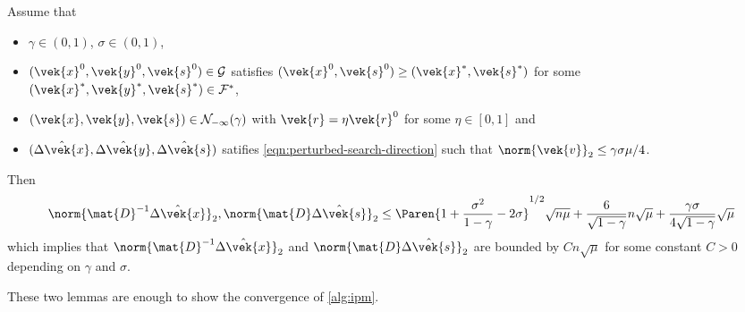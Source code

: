 \begin{lemma}\label{thm:delta-x-s-bound}
  Assume that
  \begin{itemize}
    \item \(\gamma \in (0, 1)\), \(\sigma \in (0, 1)\), 
    \item \((\vek{x}^0, \vek{y}^0, \vek{s}^0) \in \mathcal{G}\) satisfies \((\vek{x}^0, \vek{s}^0) \geq (\vek{x}^*, \vek{s}^*)\) for some \((\vek{x}^*, \vek{y}^*, \vek{s}^*) \in \mathcal{F}^*\), 
    \item \((\vek{x}, \vek{y}, \vek{s}) \in \mathcal{N}_{-\infty}(\gamma)\) with \(\vek{r} = \eta \vek{r}^0\) for some \(\eta \in [0, 1]\) and
    \item \((\hat{\Delta\vek{x}}, \hat{\Delta\vek{y}}, \hat{\Delta\vek{s}})\) satifies \cref{eqn:perturbed-search-direction} such that \(\norm{\vek{v}}_2 \leq \gamma \sigma \mu / 4\).
  \end{itemize}
  Then
  \[ \norm{\mat{D}^{-1}\hat{\Delta\vek{x}}}_2, \norm{\mat{D}\hat{\Delta\vek{s}}}_2 \leq \Paren{1 + \frac{\sigma^2}{1- \gamma} - 2\sigma}^{1/2} \sqrt{n \mu} + \frac{6}{\sqrt{1 - \gamma}} n\sqrt{\mu} + \frac{\gamma \sigma}{4 \sqrt{1 - \gamma}}\sqrt{\mu}\]
  which implies that \(\norm{\mat{D}^{-1}\hat{\Delta\vek{x}}}_2\) and \(\norm{\mat{D}\hat{\Delta\vek{s}}}_2\) are bounded by \(C n \sqrt{\mu}\) for some constant \(C > 0\) depending on \(\gamma\) and \(\sigma\).
\end{lemma}

These two lemmas are enough to show the convergence of \cref{alg:ipm}.

